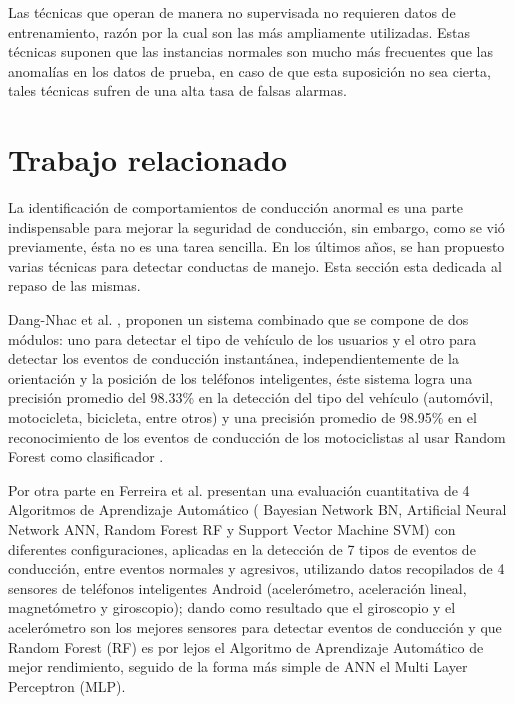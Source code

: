 Las t\'{e}cnicas que operan de manera no supervisada no requieren datos de entrenamiento, raz\'{o}n por la cual son las m\'{a}s ampliamente utilizadas. Estas t\'{e}cnicas suponen que las instancias normales son mucho m\'{a}s frecuentes que  las anomal\'{i}as en los datos de prueba, en caso de que esta suposici\'{o}n no sea cierta, tales t\'{e}cnicas sufren de una alta tasa de falsas alarmas.

\section{Trabajo relacionado}

La identificación de comportamientos de conducción anormal es una parte indispensable para mejorar la seguridad de conducción, sin embargo, como se vi\'{o} previamente, \'{e}sta no es una tarea sencilla. En los últimos años, se han propuesto varias técnicas para detectar conductas de manejo. Esta secci\'{o}n esta dedicada al repaso de las mismas.

\vspace{5mm} %

Dang-Nhac et al. \cite{20}, proponen un sistema combinado que se compone de dos módulos: uno para detectar el tipo de vehículo de los usuarios y el otro para detectar los eventos de conducción instantánea, independientemente de la orientación y la posición de los teléfonos inteligentes, \'{e}ste sistema logra una precisión promedio del 98.33\% en la detección del tipo del vehículo (autom\'{o}vil, motocicleta, bicicleta, entre otros) y una precisión promedio de 98.95\% en el reconocimiento de los eventos de conducción de los motociclistas al usar Random Forest como clasificador .

\vspace{5mm} %

Por otra parte en \cite{21} Ferreira et al. presentan una evaluación cuantitativa de 4 Algoritmos de Aprendizaje Autom\'{a}tico ( Bayesian Network BN, Artificial Neural Network ANN, Random Forest RF y Support Vector Machine SVM) con diferentes configuraciones, aplicadas en la detección de 7 tipos de eventos de conducción, entre eventos normales y agresivos, utilizando datos recopilados de 4 sensores de teléfonos inteligentes Android (acelerómetro, aceleración lineal, magnetómetro y giroscopio); dando como resultado que el giroscopio y el acelerómetro son los mejores sensores para detectar eventos de conducción y que Random Forest (RF) es por lejos el Algoritmo de Aprendizaje Autom\'{a}tico de mejor rendimiento, seguido de la forma m\'{a}s simple de ANN el Multi Layer Perceptron (MLP).

